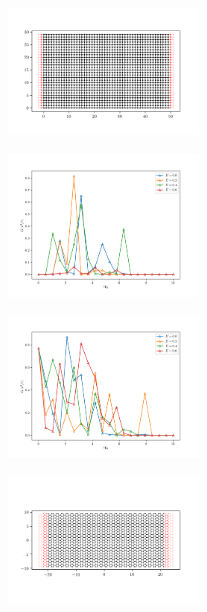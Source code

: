 \documentclass[11pt, a4paper, twocolumn]{article}
\begin{document}
\begin{figure}[H]
  \begin{center}
  \includegraphics[width=0.45\textwidth]{./media/square_lattice_W=30_L=50.png}
  \caption{}
  \label{fig:square_lattice_W_30_L_50}
  \end{center}
\end{figure}

\begin{figure}[H]
  \begin{center}
  \includegraphics[width=0.45\textwidth]{./media/transmission_square_lat_phi=0dot0.png}
  \caption{}
  \label{fig:transmission_square_lat_phi_0dot0}
  \end{center}
\end{figure}

\begin{figure}[H]
  \begin{center}
  \includegraphics[width=0.45\textwidth]{./media/transmission_square_lat_phi=0dot2.png}
  \caption{}
  \label{fig:transmission_square_lat_phi_0dot2.png}
  \end{center}
\end{figure}

\begin{figure}[H]
  \begin{center}
  \includegraphics[width=0.45\textwidth]{./media/graphene_lattice_W=20_L=40.png}
  \caption{}
  \label{fig:graphene_lattice_W_20_L_40.png}
  \end{center}
\end{figure}
\end{document}
